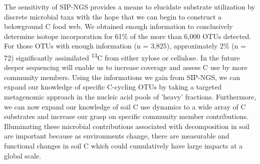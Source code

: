 The sensitivity of SIP-NGS provides a means to elucidate substrate utilization by discrete microbial taxa with the hope that we can begin to construct a belowground C food web. We obtained enough information to conclusively determine isotope incorporation for 61\% of the more than 6,000 OTUs detected. For those OTUs with enough information (n = 3,825), approximately 2\% (n = 72) significantly assimilated \textsuperscript{13}C from either xylose or cellulose. In the future deeper sequencing will enable us to increase coverage and assess C use by more community members. Using the informations we gain from SIP-NGS, we can expand our knowledge of specific C-cycling OTUs by taking a targeted metagenomic approach in the nucleic acid pools of 'heavy' fractions. Furthermore, we can now expand our knowledge of soil C use dynamics to a wide array of C substrates and increase our grasp on specific community member contributions. Illuminating these microbial contributions associated with decomposition in soil are important because as environments change, there are measurable and functional changes in soil C \cite{Grandy_2008} which could cumulatively have large impacts at a global scale.
